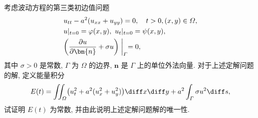 

\begin{exercise}
  考虑波动方程的第三类初边值问题
  \begin{align*}
    & u_{tt} - a^2(u_{xx}+u_{yy}) = 0,\quad t>0, (x,y)\in\varOmega, \\
    & u|_{t=0} = \varphi(x,y),\ u_t|_{t=0} = \psi(x,y), \\
    & \biggl(\frac{\partial u}{\partial \bm{n}}+\sigma u\biggr)\biggm|_{\varGamma} = 0,
  \end{align*}
  其中 $\sigma>0$ 是常数, $\varGamma$ 为 $\varOmega$ 的边界,
  $\bm{n}$ 是 $\varGamma$ 上的单位外法向量. 对于上述定解问题的解, 定义能量积分
  \[E(t) = \iint_{\varOmega} \bigl(u_t^2+a^2(u_x^2+u_y^2)\bigr)\diff x\diff y
    + a^2\int_{\varGamma} \sigma u^2\diff s,\]
  试证明 $E(t)$ 为常数, 并由此说明上述定解问题解的唯一性.
\end{exercise}

